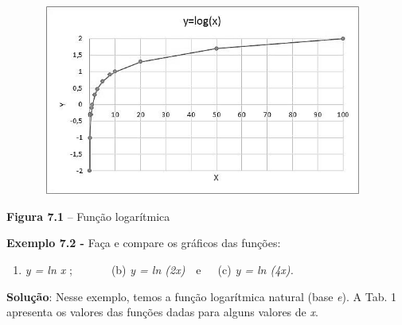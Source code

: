 \documentclass[12pt]{article}
\begin{document}
\vspace{\baselineskip}



\begin{figure}[H]
	\begin{Center}
		\includegraphics[width=4.3in,height=2.46in]{./media/image5.jpeg}
	\end{Center}
\end{figure}



\par

\begin{adjustwidth}{0.75in}{0.0in}
\textbf{Figura 7.1} – Função logarítmica\par

\end{adjustwidth}


\vspace{\baselineskip}
\begin{adjustwidth}{0.75in}{0.0in}
\textbf{Exemplo 7.2 -} Faça e compare os gráficos das funções: \par

\end{adjustwidth}


\vspace{\baselineskip}
\begin{enumerate}
	\item  \textit{y = ln x} ;\ \ \ \ \ \  \tab \ (b)  \textit{y = ln (2x)}\ \  \tab e\ \ \  \tab (c) \textit{y = ln (4x).}\ \ \ \  
\end{enumerate}\par


\vspace{\baselineskip}
\begin{adjustwidth}{0.69in}{0.0in}
\textbf{Solução}: Nesse exemplo, temos a função logarítmica natural (base \textit{e}). A Tab. 1 apresenta os valores das funções dadas para alguns valores de \textit{x}.\par

\end{adjustwidth}
\end{document}
